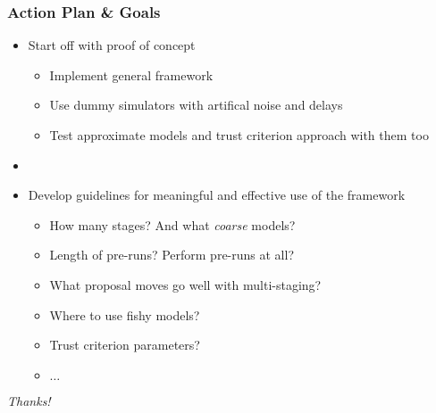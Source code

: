 \begin{frame}
    \frametitle{Action Plan \& Goals} 
    \begin{itemize}
	\item Start off with proof of concept
	\begin{itemize}
	    \item Implement general framework
	    \item Use dummy simulators with artifical noise and delays 
	    \item Test approximate models and trust criterion approach with them too 
	\end{itemize}
	\item[]
	\item Develop guidelines for meaningful and effective use of the framework
	\begin{itemize}
	    \item How many stages? And what \emph{coarse} models?
	    \item Length of pre-runs? Perform pre-runs at all?
	    \item What proposal moves go well with multi-staging?
	    \item Where to use fishy models? 
	    \item Trust criterion parameters?
	    \item $\dots$
	\end{itemize}
    \end{itemize}
\end{frame}

\begin{frame}[c]{}
    \centering
    \Huge \emph{Thanks!}
\end{frame}

